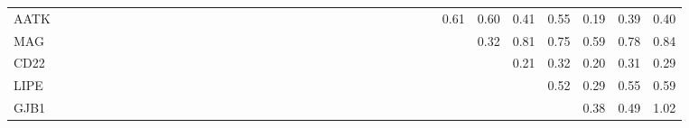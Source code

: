 \begin{longtable}{lrrrrrrrrrrrrrrrrrrrrrrrrrrrrrrrrrrrrr}
AATK    &              &             &               &               &             &             &           &          &              &              &            &            &           &             &             &             &             &              &             &               &              &             &               &               &             &            &             &           &             &            &      0.61 &       0.60 &       0.41 &       0.55 &       0.19 &         0.39 &       0.40 \\
MAG     &              &             &               &               &             &             &           &          &              &              &            &            &           &             &             &             &             &              &             &               &              &             &               &               &             &            &             &           &             &            &           &       0.32 &       0.81 &       0.75 &       0.59 &         0.78 &       0.84 \\
CD22    &              &             &               &               &             &             &           &          &              &              &            &            &           &             &             &             &             &              &             &               &              &             &               &               &             &            &             &           &             &            &           &            &       0.21 &       0.32 &       0.20 &         0.31 &       0.29 \\
LIPE    &              &             &               &               &             &             &           &          &              &              &            &            &           &             &             &             &             &              &             &               &              &             &               &               &             &            &             &           &             &            &           &            &            &       0.52 &       0.29 &         0.55 &       0.59 \\
GJB1    &              &             &               &               &             &             &           &          &              &              &            &            &           &             &             &             &             &              &             &               &              &             &               &               &             &            &             &           &             &            &           &            &            &            &       0.38 &         0.49 &       1.02 \\

\end{longtable}
